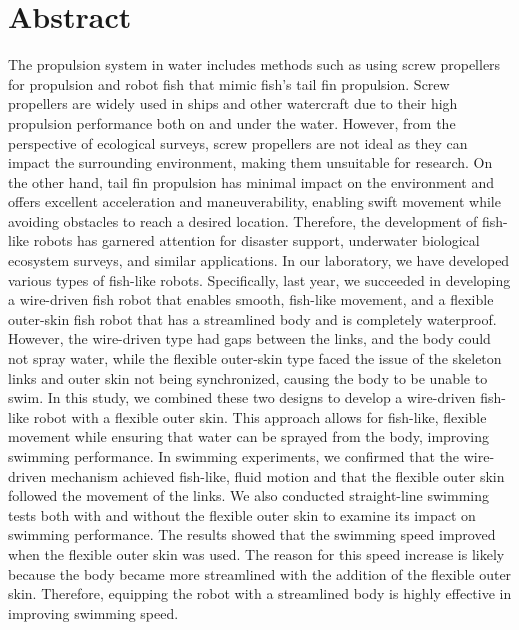 \newpage
\section*{Abstract}
The propulsion system in water includes methods such as using screw propellers for propulsion and robot fish that mimic fish's tail fin 
propulsion. Screw propellers are widely used in ships and other watercraft due to their high propulsion performance both on and under 
the water. However, from the perspective of ecological surveys, screw propellers are not ideal as they can impact the surrounding 
environment, making them unsuitable for research. On the other hand, tail fin propulsion has minimal impact on the environment and offers 
excellent acceleration and maneuverability, enabling swift movement while avoiding obstacles to reach a desired location. Therefore, 
the development of fish-like robots has garnered attention for disaster support, underwater biological ecosystem surveys, and similar 
applications.
In our laboratory, we have developed various types of fish-like robots. Specifically, last year, we succeeded in developing a wire-driven 
fish robot that enables smooth, fish-like movement, and a flexible outer-skin fish robot that has a streamlined body and is completely 
waterproof. However, the wire-driven type had gaps between the links, and the body could not spray water, while the flexible outer-skin 
type faced the issue of the skeleton links and outer skin not being synchronized, causing the body to be unable to swim.
In this study, we combined these two designs to develop a wire-driven fish-like robot with a flexible outer skin. This approach 
allows for fish-like, flexible movement while ensuring that water can be sprayed from the body, improving swimming performance. 
In swimming experiments, we confirmed that the wire-driven mechanism achieved fish-like, fluid motion and that the flexible outer 
skin followed the movement of the links. We also conducted straight-line swimming tests both with and without the flexible outer 
skin to examine its impact on swimming performance. The results showed that the swimming speed improved when the flexible outer 
skin was used. The reason for this speed increase is likely because the body became more streamlined with the addition of the 
flexible outer skin. Therefore, equipping the robot with a streamlined body is highly effective in improving swimming speed.